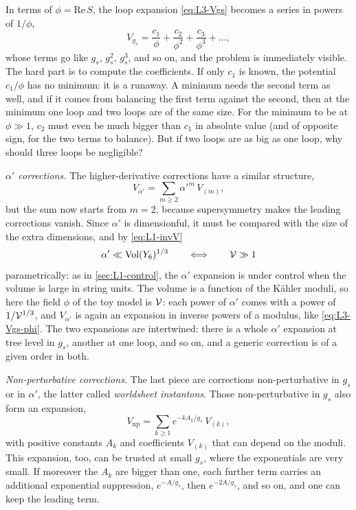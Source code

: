 In terms of $\phi = \mathrm{Re}\,S$, the loop expansion \cref{eq:L3-Vgs} becomes a series in powers of $1/\phi$,
\begin{equation}
  V_{g_s} = \frac{c_1}{\phi} + \frac{c_2}{\phi^2} + \frac{c_3}{\phi^3} + \dots ,
  \label{eq:L3-Vgs-phi}
\end{equation}
whose terms go like $g_s$, $g_s^2$, $g_s^3$, and so on, and the problem is immediately visible. The hard part is to compute the coefficients. If only $c_1$ is known, the potential $c_1/\phi$ has no minimum: it is a runaway. A minimum needs the second term as well, and if it comes from balancing the first term against the second, then at the minimum one loop and two loops are of the same size. For the minimum to be at $\phi\gg1$, $c_2$ must even be much bigger than $c_1$ in absolute value (and of opposite sign, for the two terms to balance). But if two loops are as big as one loop, why should three loops be negligible?

\emph{$\alpha'$ corrections.} The higher-derivative corrections have a similar structure,
\begin{equation}
  V_{\alpha'} = \sum_{m\ge2}\alpha'^m\,V_{(m)} ,
  \label{eq:L3-Valpha}
\end{equation}
but the sum now starts from $m = 2$, because supersymmetry makes the leading corrections vanish. Since $\alpha'$ is dimensionful, it must be compared with the size of the extra dimensions, and by \cref{eq:L1-invV}
\begin{equation}
  \alpha'\ll\mathrm{Vol}(Y_6)^{1/3} \qquad\Longleftrightarrow\qquad \mathcal{V}\gg1
  \label{eq:L3-largeV}
\end{equation}
parametrically: as in \cref{sec:L1-control}, the $\alpha'$ expansion is under control when the volume is large in string units.
The volume is a function of the Kähler moduli, so here the field $\phi$ of the toy model is $\mathcal{V}$: each power of $\alpha'$ comes with a power of $1/\mathcal{V}^{1/3}$, and $V_{\alpha'}$ is again an expansion in inverse powers of a modulus, like \cref{eq:L3-Vgs-phi}. The two expansions are intertwined: there is a whole $\alpha'$ expansion at tree level in $g_s$, another at one loop, and so on, and a generic correction is of a given order in both.

\emph{Non-perturbative corrections.} The last piece are corrections non-perturbative in $g_s$ or in $\alpha'$, the latter called \emph{worldsheet instantons}. Those non-perturbative in $g_s$ also form an expansion,
\begin{equation}
  V_{\text{np}} = \sum_{k\ge1}e^{-kA_k/g_s}\,V_{(k)} ,
  \label{eq:L3-Vnp}
\end{equation}
with positive constants $A_k$ and coefficients $V_{(k)}$ that can depend on the moduli. This expansion, too, can be trusted at small $g_s$, where the exponentials are very small. If moreover the $A_k$ are bigger than one, each further term carries an additional exponential suppression, $e^{-A/g_s}$, then $e^{-2A/g_s}$, and so on, and one can keep the leading term.


